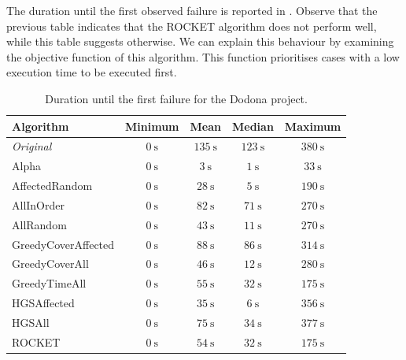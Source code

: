 \noindent The duration until the first observed failure is reported in . Observe that the previous table indicates that the ROCKET algorithm does not perform well, while this table suggests otherwise. We can explain this behaviour by examining the objective function of this algorithm. This function prioritises cases with a low execution time to be executed first.\\

\begin{table}[htbp!]
	\centering
	\begin{tabularx}{\textwidth}{|X||c|c|c|c|}
		\hline
		\textbf{Algorithm} & \textbf{Minimum} & \textbf{Mean} & \textbf{Median} & \textbf{Maximum}\\
		
		\hline
		
		\emph{Original} & $\SI{0}{\second}$ & $\SI{135}{\second}$ & $\SI{123}{\second}$ & $\SI{380}{\second}$\\
		
		\hline
		
		Alpha & $\SI{0}{\second}$ & $\SI{3}{\second}$ & $\SI{1}{\second}$ & $\SI{33}{\second}$\\
		
		\hline
		AffectedRandom & $\SI{0}{\second}$ & $\SI{28}{\second}$ & $\SI{5}{\second}$ & $\SI{190}{\second}$\\
		AllInOrder & $\SI{0}{\second}$ & $\SI{82}{\second}$ & $\SI{71}{\second}$ & $\SI{270}{\second}$\\
		AllRandom & $\SI{0}{\second}$ & $\SI{43}{\second}$ & $\SI{11}{\second}$ & $\SI{270}{\second}$\\
		
		\hline
		
		GreedyCoverAffected & $\SI{0}{\second}$ & $\SI{88}{\second}$ & $\SI{86}{\second}$ & $\SI{314}{\second}$\\
		GreedyCoverAll & $\SI{0}{\second}$ & $\SI{46}{\second}$ & $\SI{12}{\second}$ & $\SI{280}{\second}$\\
		GreedyTimeAll & $\SI{0}{\second}$ & $\SI{55}{\second}$ & $\SI{32}{\second}$ & $\SI{175}{\second}$\\
		
		\hline
		
		HGSAffected & $\SI{0}{\second}$ & $\SI{35}{\second}$ & $\SI{6}{\second}$ & $\SI{356}{\second}$\\
		HGSAll & $\SI{0}{\second}$ & $\SI{75}{\second}$ & $\SI{34}{\second}$ & $\SI{377}{\second}$\\
		
		\hline
		
		ROCKET & $\SI{0}{\second}$ & $\SI{54}{\second}$ & $\SI{32}{\second}$ & $\SI{175}{\second}$\\
		
		\hline
	\end{tabularx}
	\caption{Duration until the first failure for the Dodona project.}
	\label{tbl:rq4-first-failure-duration}
\end{table}

